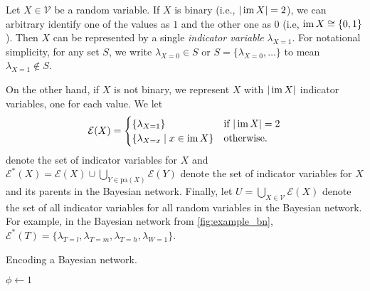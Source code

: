 \begin{definition}
  Let $X \in \mathcal{V}$ be a random variable. If $X$ is binary (i.e., $|\operatorname{im} X|
  = 2$), we can arbitrary identify one of the values as $1$ and the other one as
  $0$ (i.e, $\operatorname{im} X \cong \{ 0, 1 \}$). Then $X$ can be represented by a single
  \emph{indicator variable} $\lambda_{X=1}$. For notational simplicity, for any
  set $S$, we write $\lambda_{X=0} \in S$ or $S = \{ \lambda_{X=0}, \dots \}$ to
  mean $\lambda_{X=1} \not\in S$.

  On the other hand, if $X$ is not binary, we represent $X$ with $|\operatorname{im} X|$
  indicator variables, one for each value. We let
  \[
    \mathcal{E}(X) = \begin{cases}
      \{ \lambda_{X=1} \} & \text{if } |\operatorname{im} X| = 2 \\
      \{ \lambda_{X=x} \mid x \in \operatorname{im} X \} & \text{otherwise.}
    \end{cases}
  \]
  denote the set of indicator variables for $X$ and $\mathcal{E}^*(X) =
  \mathcal{E}(X) \cup \bigcup_{Y \in \mathrm{pa}(X)} \mathcal{E}(Y)$ denote the
  set of indicator variables for $X$ and its parents in the Bayesian network.
  Finally, let $U = \bigcup_{X \in \mathcal{V}} \mathcal{E}(X)$ denote the set
  of all indicator variables for all random variables in the Bayesian network.
  For example, in the Bayesian network from \cref{fig:example_bn},
  $\mathcal{E}^*(T) = \{ \lambda_{T=l}, \lambda_{T=m}, \lambda_{T=h},
  \lambda_{W=1} \}$.
\end{definition}

\begin{algorithm}[t]
  \caption{Encoding a Bayesian network.}
  \label{alg:encoding}
  $\phi \gets 1$\;
  \Return{$\phi$}\;
\end{algorithm}

